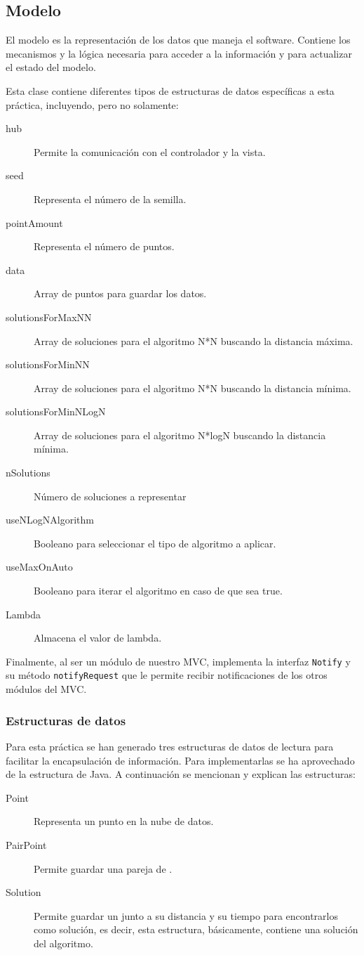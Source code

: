 \subsection{Modelo}

El modelo es la representación de los datos que maneja el software. Contiene los mecanismos y la lógica necesaria para acceder a la información y para actualizar el estado del modelo.\bigskip

Esta clase contiene diferentes tipos de estructuras de datos específicas a esta práctica, incluyendo, pero no solamente: \\

\begin{description}
\item[hub] Permite la comunicación con el controlador y la vista.
\item[seed] Representa el número de la semilla.
\item[pointAmount] Representa el número de puntos.
\item[data] Array de puntos para guardar los datos. 
\item[solutionsForMaxNN] Array de soluciones para el algoritmo N*N buscando la distancia máxima.
\item[solutionsForMinNN] Array de soluciones para el algoritmo N*N buscando la distancia mínima.
\item[solutionsForMinNLogN] Array de soluciones para el algoritmo N*logN buscando la distancia mínima.
\item[nSolutions] Número de soluciones a representar
\item[useNLogNAlgorithm] Booleano para seleccionar el tipo de algoritmo a aplicar.
\item[useMaxOnAuto] Booleano para iterar el algoritmo en caso de que sea true.
\item[Lambda] Almacena el valor de lambda. 
\end{description}

Finalmente, al ser un módulo de nuestro MVC, implementa la interfaz \texttt{Notify} y su método \texttt{notifyRequest} que le permite recibir notificaciones de los otros módulos del MVC.

\subsubsection{Estructuras de datos}
Para esta práctica se han generado tres estructuras de datos de lectura para facilitar la encapsulación de información. Para implementarlas se ha aprovechado de la estructura  de Java. A continuación se mencionan y explican las estructuras:

\begin{description}
\item[Point] Representa un punto en la nube de datos.
\item[PairPoint] Permite guardar una pareja de .
\item[Solution] Permite guardar un  junto a su distancia y su tiempo para encontrarlos como solución, es decir, esta estructura, básicamente, contiene una solución del algoritmo.
\end{description}
